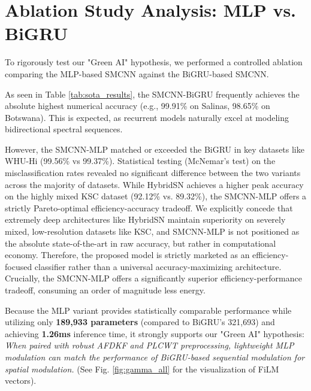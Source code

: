 \documentclass[pdflatex,sn-mathphys-num,iicol]{sn-jnl}
\begin{document}
\section{Ablation Study Analysis: MLP vs. BiGRU}\label{sec:ablation}

To rigorously test our "Green AI" hypothesis, we performed a controlled ablation comparing the MLP-based SMCNN against the BiGRU-based SMCNN. 

As seen in Table \ref{tab:sota_results}, the SMCNN-BiGRU frequently achieves the absolute highest numerical accuracy (e.g., 99.91\% on Salinas, 98.65\% on Botswana). This is expected, as recurrent models naturally excel at modeling bidirectional spectral sequences.

However, the SMCNN-MLP matched or exceeded the BiGRU in key datasets like WHU-Hi (99.56\% vs 99.37\%). Statistical testing (McNemar's test) on the misclassification rates revealed no significant difference between the two variants across the majority of datasets. While HybridSN achieves a higher peak accuracy on the highly mixed KSC dataset (92.12\% vs. 89.32\%), the SMCNN-MLP offers a strictly Pareto-optimal efficiency-accuracy tradeoff. We explicitly concede that extremely deep architectures like HybridSN maintain superiority on severely mixed, low-resolution datasets like KSC, and SMCNN-MLP is not positioned as the absolute state-of-the-art in raw accuracy, but rather in computational economy. Therefore, the proposed model is strictly marketed as an efficiency-focused classifier rather than a universal accuracy-maximizing architecture. Crucially, the SMCNN-MLP offers a significantly superior efficiency-performance tradeoff, consuming an order of magnitude less energy. 

Because the MLP variant provides statistically comparable performance while utilizing only \textbf{189,933 parameters} (compared to BiGRU's 321,693) and achieving \textbf{1.26ms} inference time, it strongly supports our "Green AI" hypothesis: \textit{When paired with robust AFDKF and PLCWT preprocessing, lightweight MLP modulation can match the performance of BiGRU-based sequential modulation for spatial modulation.} (See Fig. \ref{fig:gamma_all} for the visualization of FiLM vectors).



\end{document}
